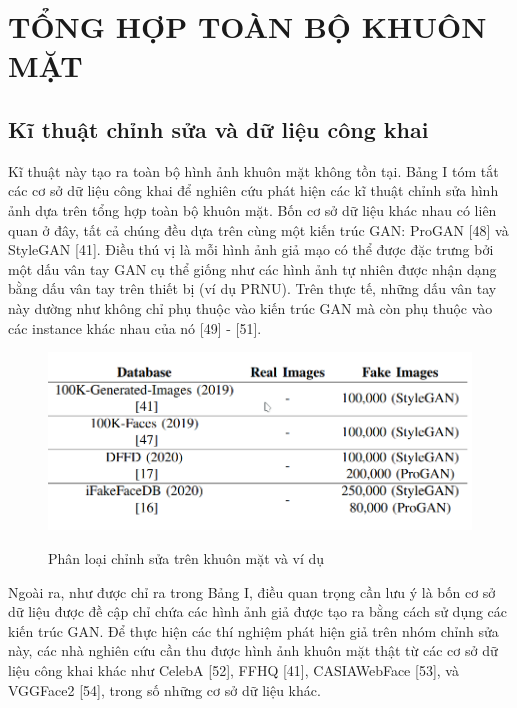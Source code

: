 \documentclass{article}
\begin{document}
\section{TỔNG HỢP TOÀN BỘ KHUÔN MẶT}

\subsection{Kĩ thuật chỉnh sửa và dữ liệu công khai}

Kĩ thuật này tạo ra toàn bộ hình ảnh khuôn mặt không tồn tại. Bảng I tóm tắt các cơ sở dữ liệu công khai để nghiên cứu phát hiện các kĩ thuật chỉnh sửa hình ảnh dựa trên tổng hợp toàn bộ khuôn mặt. Bốn cơ sở dữ liệu khác nhau có liên quan ở đây, tất cả chúng đều dựa trên cùng một kiến trúc GAN: ProGAN [48] và StyleGAN [41]. Điều thú vị là mỗi hình ảnh giả mạo có thể được đặc trưng bởi một dấu vân tay GAN cụ thể giống như các hình ảnh tự nhiên được nhận dạng bằng dấu vân tay trên thiết bị (ví dụ PRNU). Trên thực tế, những dấu vân tay này dường như không chỉ phụ thuộc vào kiến trúc GAN mà còn phụ thuộc vào các instance khác nhau của nó [49] - [51].

\begin{figure}[h!]
\caption{Phân loại chỉnh sửa trên khuôn mặt và ví dụ}
\includegraphics[width=\columnwidth]{table-1-database}
\label{table-1-database}
\end{figure}

Ngoài ra, như được chỉ ra trong Bảng I, điều quan trọng cần lưu ý là bốn cơ sở dữ liệu được đề cập chỉ chứa các hình ảnh giả được tạo ra bằng cách sử dụng các kiến trúc GAN. Để thực hiện các thí nghiệm phát hiện giả trên nhóm chỉnh sửa này, các nhà nghiên cứu cần thu được hình ảnh khuôn mặt thật từ các cơ sở dữ liệu công khai khác như CelebA [52], FFHQ [41], CASIAWebFace [53], và VGGFace2 [54], trong số những cơ sở dữ liệu khác.
\end{document}

